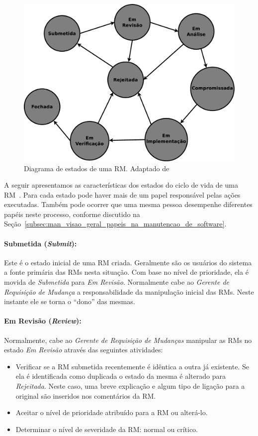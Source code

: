 \begin{figure}[htpb]
	\centering
    \includegraphics[width=0.7\linewidth]{./chapter-manutencao-software-visao-geral/img/diagrama-estado-rm.eps}
	\caption{Diagrama de estados de uma RM\@. Adaptado
		de~\cite{tripathy2014software}}\label{fig:diagrama-estado-rm}
\end{figure}

A seguir apresentamos as características dos estados do ciclo de vida de uma
RM~\cite{tripathy2014software}. Para cada estado pode haver mais de um papel
responsável pelas ações executadas. Também pode ocorrer que uma mesma pessoa
desempenhe diferentes papéis neste processo, conforme discutido na
Seção~\ref{subsec:man_visao_geral_papeis_na_manutencao_de_software}.

\paragraph{Submetida (\textit{Submit}):}\label{par:submetida)}

Este é o estado inicial de uma RM criada. Geralmente são os usuários do sistema
a fonte primária das RMs nesta situação. Com base no nível de prioridade, ela é
movida de \textit{Submetida} para \textit{Em Revisão}. Normalmente cabe ao
\textit{Gerente de Requisição de Mudança} a responsabilidade da manipulação
inicial das RMs. Neste instante ele se torna o ``dono'' das mesmas.

\paragraph{Em Revisão (\textit{Review}):}\label{par:em_revisao}
Normalmente, cabe ao \textit{Gerente de Requisição de Mudanças} manipular as
RMs no estado \textit{Em Revisão} através das seguintes atividades:

\begin{itemize}
    \item Verificar se a RM submetida recentemente é idêntica a outra já
        existente. Se ela é identificada como duplicada o estado da mesma é
        alterado para \textit{Rejeitada}. Neste caso, uma breve explicação e
        algum tipo de ligação para a original são inseridos nos comentários da
        RM\@.
	\item Aceitar o nível de prioridade atribuído para a RM ou alterá-lo.
	\item Determinar o nível de severidade da RM\@: normal ou crítico.
\end{itemize}

